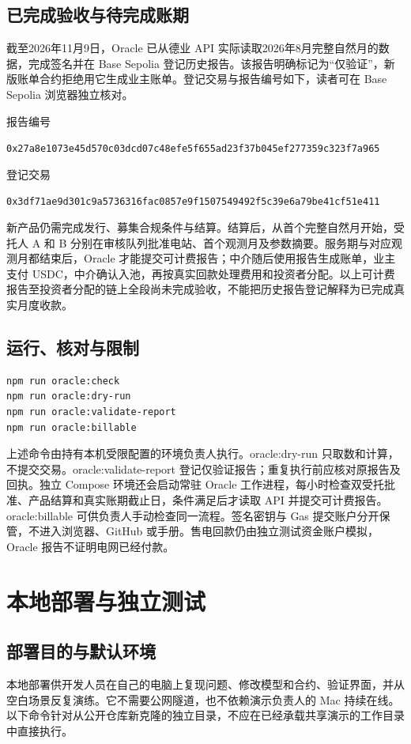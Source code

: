 \documentclass[12pt,a4paper]{article}
\begin{document}
\subsection{已完成验收与待完成账期}
截至2026年11月9日，Oracle 已从德业 API 实际读取2026年8月完整自然月的数据，完成签名并在 Base Sepolia 登记历史报告。该报告明确标记为“仅验证”，新版账单合约拒绝用它生成业主账单。登记交易与报告编号如下，读者可在 Base Sepolia 浏览器独立核对。

报告编号\par\nolinkurl{0x27a8e1073e45d570c03dcd07c48efe5f655ad23f37b045ef277359c323f7a965}\par
登记交易\par\nolinkurl{0x3df71ae9d301c9a5736316fac0857e9f1507549492f5c39e6a79be41cf51e411}\par
新产品仍需完成发行、募集合规条件与结算。结算后，从首个完整自然月开始，受托人 A 和 B 分别在审核队列批准电站、首个观测月及参数摘要。服务期与对应观测月都结束后，Oracle 才能提交可计费报告；中介随后使用报告生成账单，业主支付 USDC，中介确认入池，再按真实回款处理费用和投资者分配。以上可计费报告至投资者分配的链上全段尚未完成验收，不能把历史报告登记解释为已完成真实月度收款。

\subsection{运行、核对与限制}
\begin{verbatim}
npm run oracle:check
npm run oracle:dry-run
npm run oracle:validate-report
npm run oracle:billable
\end{verbatim}
上述命令由持有本机受限配置的环境负责人执行。oracle:dry-run 只取数和计算，不提交交易。oracle:validate-report 登记仅验证报告；重复执行前应核对原报告及回执。独立 Compose 环境还会启动常驻 Oracle 工作进程，每小时检查双受托批准、产品结算和真实账期截止日，条件满足后才读取 API 并提交可计费报告。oracle:billable 可供负责人手动检查同一流程。签名密钥与 Gas 提交账户分开保管，不进入浏览器、GitHub 或手册。售电回款仍由独立测试资金账户模拟，Oracle 报告不证明电网已经付款。

\clearpage\section{本地部署与独立测试}
\subsection{部署目的与默认环境}
本地部署供开发人员在自己的电脑上复现问题、修改模型和合约、验证界面，并从空白场景反复演练。它不需要公网隧道，也不依赖演示负责人的 Mac 持续在线。以下命令针对从公开仓库新克隆的独立目录，不应在已经承载共享演示的工作目录中直接执行。
\end{document}
